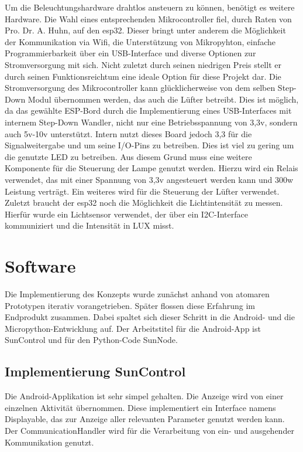 Um die Beleuchtungshardware drahtlos ansteuern zu können, benötigt es weitere Hardware. Die Wahl eines entsprechenden Mikrocontroller fiel, durch Raten von Pro. Dr. A. Huhn, auf den esp32. Dieser bringt unter anderem die Möglichkeit der Kommunikation via Wifi, die Unterstützung von Mikropyhton, einfache Programmierbarkeit über ein USB-Interface und diverse Optionen zur Stromversorgung mit sich. Nicht zuletzt durch seinen niedrigen Preis stellt er durch seinen Funktionsreichtum eine ideale Option für diese Projekt dar. Die Stromversorgung des Mikrocontroller kann glücklicherweise von dem selben Step-Down Modul übernommen werden, das auch die Lüfter betreibt. Dies ist möglich, da das gewählte ESP-Bord durch die Implementierung eines USB-Interfaces mit internem Step-Down Wandler, nicht nur eine Betriebsspannung von 3,3v, sondern auch 5v-10v unterstützt. Intern nutzt dieses Board jedoch 3,3 für die Signalweitergabe und um seine I/O-Pins zu betreiben. Dies ist viel zu gering um die genutzte LED zu betreiben. Aus diesem Grund muss eine weitere Komponente für die Steuerung der Lampe genutzt werden. Hierzu wird ein Relais verwendet, das mit einer Spannung von 3,3v angesteuert werden kann und 300w Leistung verträgt. Ein weiteres wird für die Steuerung der Lüfter verwendet. Zuletzt braucht der esp32 noch die Möglichkeit die Lichtintensität zu messen. Hierfür wurde ein Lichtsensor verwendet, der über ein I2C-Interface kommuniziert und die Intensität in LUX misst.

\section{Software}
Die Implementierung des Konzepts wurde zunächst anhand von atomaren Prototypen iterativ vorangetrieben. Später flossen diese Erfahrung im Endprodukt zusammen. Dabei spaltet sich dieser Schritt in die Android- und die Micropython-Entwicklung auf. Der Arbeitstitel für die Android-App ist \glqq SunControl\grqq{} und für den Python-Code \glqq SunNode\grqq{}.


\subsection{Implementierung SunControl}
Die Android-Applikation ist sehr simpel gehalten. Die Anzeige wird von einer einzelnen Aktivität übernommen. Diese implementiert ein Interface namens \glqq Displayable\grqq{}, das zur Anzeige aller relevanten Parameter genutzt werden kann. Der \glqq CommunicationHandler\grqq{} wird für die Verarbeitung von ein- und ausgehender Kommunikation genutzt.

